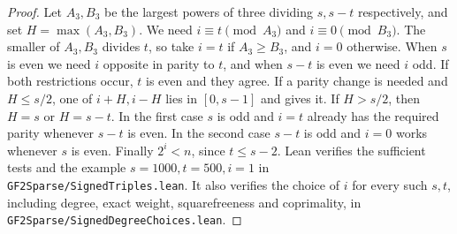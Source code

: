 \documentclass[11pt]{article}
\begin{document}
\begin{proof}
Let \(A_3,B_3\) be the largest powers of three dividing \(s,s-t\)
respectively, and set \(H=\max(A_3,B_3)\).
We need \(i\equiv t\pmod{A_3}\) and \(i\equiv0\pmod{B_3}\).
The smaller of \(A_3,B_3\) divides \(t\), so take \(i=t\) if
\(A_3\ge B_3\), and \(i=0\) otherwise. When \(s\) is even we need
\(i\) opposite in parity to \(t\), and when \(s-t\) is even we
need \(i\) odd. If both restrictions occur, \(t\) is even and they
agree. If a parity change is needed and \(H\le s/2\), one of
\(i+H,i-H\) lies in \([0,s-1]\) and gives it. If \(H>s/2\), then
\(H=s\) or \(H=s-t\). In the first case \(s\) is odd and \(i=t\)
already has the required parity whenever \(s-t\) is even. In the
second case \(s-t\) is odd and \(i=0\) works whenever \(s\) is even.
Finally \(2^i<n\), since \(t\le s-2\). Lean verifies the sufficient tests and the example \(s=1000,t=500,i=1\) in
\nolinkurl{GF2Sparse/SignedTriples.lean}. It also verifies the choice
of \(i\) for every such \(s,t\), including degree, exact weight,
squarefreeness and coprimality, in \nolinkurl{GF2Sparse/SignedDegreeChoices.lean}.
\end{proof}
\end{document}
